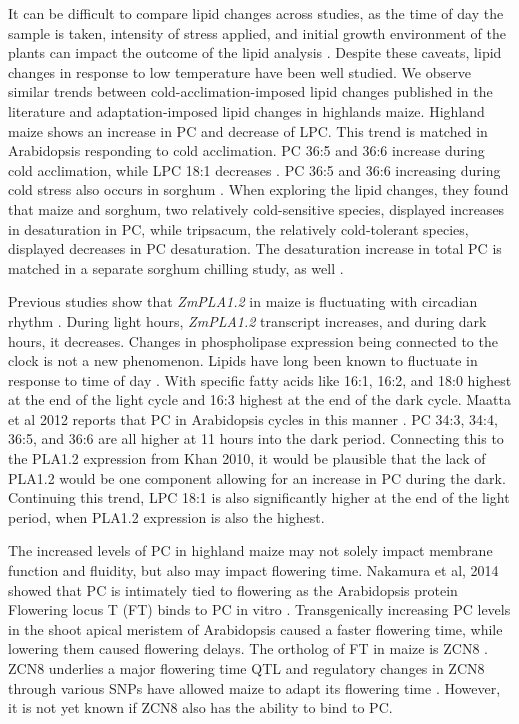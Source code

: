 \documentclass[9pt,twocolumn,twoside]{BioRxiv}
\begin{document}
It can be difficult to compare lipid changes across studies, as the time of day the sample is taken, intensity of stress applied, and initial growth environment of the plants can impact the outcome of the lipid analysis \cite{Kenchanmane_Raju2018-nz}. 
Despite these caveats, lipid changes in response to low temperature have been well studied. We observe similar trends between cold-acclimation-imposed lipid changes published in the literature and adaptation-imposed lipid changes in highlands maize. Highland maize shows an increase in PC and decrease of LPC. This trend is matched in Arabidopsis responding to cold acclimation. PC 36:5 and 36:6 increase during cold acclimation, while LPC 18:1 decreases \cite{Welti2002-uk}. PC 36:5 and 36:6 increasing during cold stress also occurs in sorghum \cite{Marla2017-ph}. 
When exploring the lipid changes, they found that maize and sorghum, two relatively cold-sensitive species, displayed increases in desaturation in PC, while tripsacum, the relatively cold-tolerant species, displayed decreases in PC desaturation. The desaturation increase in total PC is matched in a separate sorghum chilling study, as well \cite{Marla2017-ph}. 

Previous studies show that \textit{ZmPLA1.2} in maize is fluctuating with circadian rhythm \cite{Khan2010-iv}. During light hours, \textit{ZmPLA1.2} transcript increases, and during dark hours, it decreases. Changes in phospholipase expression being connected to the clock is not a new phenomenon. Lipids have long been known to fluctuate in response to time of day \cite{Browse1981-vt, Ekman2007-xe}. With specific fatty acids like 16:1, 16:2, and 18:0 highest at the end of the light cycle and 16:3 highest at the end of the dark cycle. Maatta et al 2012 reports that PC in Arabidopsis cycles in this manner \cite{Maatta2012-ip}. PC 34:3, 34:4, 36:5, and 36:6 are all higher at 11 hours into the dark period. Connecting this to the PLA1.2 expression from Khan 2010, it would be plausible that the lack of PLA1.2 would be one component allowing for an increase in PC during the dark. Continuing this trend, LPC 18:1 is also significantly higher at the end of the light period, when PLA1.2 expression is also the highest. 

The increased levels of PC in highland maize may not solely impact membrane function and fluidity, but also may impact flowering time.
Nakamura et al, 2014 showed that PC is intimately tied to flowering as the Arabidopsis protein Flowering locus T (FT) binds to PC in vitro \cite{Nakamura2014-qf}. 
Transgenically increasing PC levels in the shoot apical meristem of Arabidopsis caused a faster flowering time, while lowering them caused flowering delays. 
The ortholog of FT in maize is ZCN8 \cite{Lazakis2011-nq}. ZCN8 underlies a major flowering time QTL and regulatory changes in ZCN8 through various SNPs have allowed maize to adapt its flowering time \cite{Guo2019-pn}.
However, it is not yet known if ZCN8 also has the ability to bind to PC.
\end{document}
